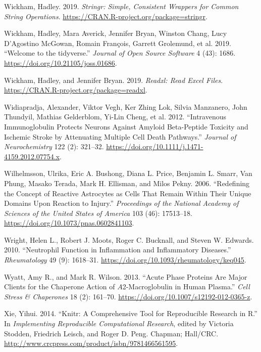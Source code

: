 \documentclass[9pt,lineno]{elife}
\newlength{\cslhangindent}
\newlength{\cslentryspacingunit} %
\newenvironment{CSLReferences}[2] %
 {%
  \setlength{\parindent}{0pt}
  \ifodd #1
  \let\oldpar\par
  \def\par{\hangindent=\cslhangindent\oldpar}
  \fi
  \setlength{\parskip}{#2\cslentryspacingunit}
 }%
 {}
\begin{document}
\begin{CSLReferences}{1}{0}
\leavevmode{}%
Wickham, Hadley. 2019. \emph{Stringr: Simple, Consistent Wrappers for Common String Operations}. \url{https://CRAN.R-project.org/package=stringr}.

\leavevmode{}%
Wickham, Hadley, Mara Averick, Jennifer Bryan, Winston Chang, Lucy D'Agostino McGowan, Romain François, Garrett Grolemund, et al. 2019. {``Welcome to the {tidyverse}.''} \emph{Journal of Open Source Software} 4 (43): 1686. \url{https://doi.org/10.21105/joss.01686}.

\leavevmode{}%
Wickham, Hadley, and Jennifer Bryan. 2019. \emph{Readxl: Read Excel Files}. \url{https://CRAN.R-project.org/package=readxl}.

\leavevmode{}%
Widiapradja, Alexander, Viktor Vegh, Ker Zhing Lok, Silvia Manzanero, John Thundyil, Mathias Gelderblom, Yi-Lin Cheng, et al. 2012. {``Intravenous Immunoglobulin Protects Neurons Against Amyloid Beta-Peptide Toxicity and Ischemic Stroke by Attenuating Multiple Cell Death Pathways.''} \emph{Journal of Neurochemistry} 122 (2): 321--32. \url{https://doi.org/10.1111/j.1471-4159.2012.07754.x}.

\leavevmode{}%
Wilhelmsson, Ulrika, Eric A. Bushong, Diana L. Price, Benjamin L. Smarr, Van Phung, Masako Terada, Mark H. Ellisman, and Milos Pekny. 2006. {``Redefining the Concept of Reactive Astrocytes as Cells That Remain Within Their Unique Domains Upon Reaction to Injury.''} \emph{Proceedings of the National Academy of Sciences of the United States of America} 103 (46): 17513--18. \url{https://doi.org/10.1073/pnas.0602841103}.

\leavevmode{}%
Wright, Helen L., Robert J. Moots, Roger C. Bucknall, and Steven W. Edwards. 2010. {``Neutrophil Function in Inflammation and Inflammatory Diseases.''} \emph{Rheumatology} 49 (9): 1618--31. \url{https://doi.org/10.1093/rheumatology/keq045}.

\leavevmode{}%
Wyatt, Amy R., and Mark R. Wilson. 2013. {``Acute Phase Proteins Are Major Clients for the Chaperone Action of {\(A\)}2-Macroglobulin in Human Plasma.''} \emph{Cell Stress \& Chaperones} 18 (2): 161--70. \url{https://doi.org/10.1007/s12192-012-0365-z}.

\leavevmode{}%
Xie, Yihui. 2014. {``Knitr: A Comprehensive Tool for Reproducible Research in {R}.''} In \emph{Implementing Reproducible Computational Research}, edited by Victoria Stodden, Friedrich Leisch, and Roger D. Peng. Chapman; Hall/CRC. \url{http://www.crcpress.com/product/isbn/9781466561595}.


\end{CSLReferences}
\end{document}
